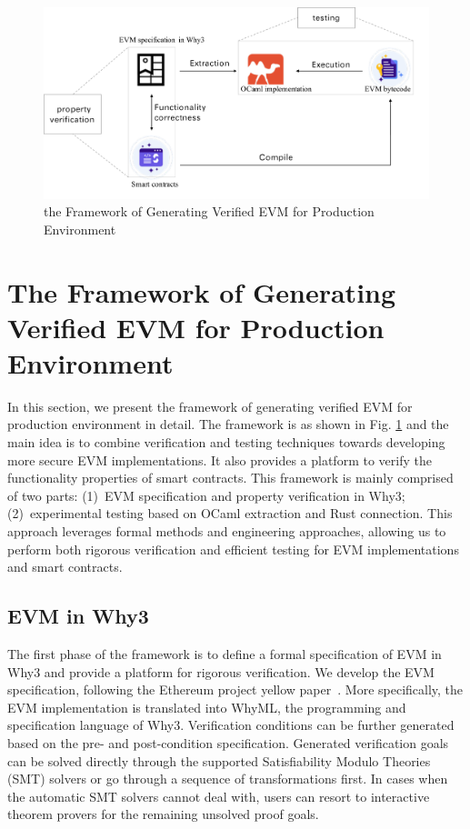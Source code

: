 \documentclass[runningheads]{llncs}
\begin{document}
\begin{figure}[t]
  \centering
  \includegraphics[scale=0.4]{framework.pdf}
  \caption{the Framework of Generating Verified EVM for Production Environment}
  \label{fig:evm1}
\end{figure}

\section{The Framework of Generating Verified EVM for Production Environment}\label{Sec: Framework}
In this section, we present the framework of generating verified EVM for production environment in detail. 
The framework is as shown in Fig. \ref{fig:evm1} and the main idea is to combine verification and testing techniques 
towards developing more secure EVM implementations.
It also provides a platform to verify the functionality properties of smart contracts.  
This framework is mainly comprised of two parts: (1)~EVM specification and property verification in Why3; (2)~experimental testing based on OCaml extraction and Rust connection. 
This approach leverages formal methods and engineering approaches, allowing us to perform 
both rigorous verification and efficient testing for EVM implementations and smart contracts. 

\subsection{EVM in Why3}
The first phase of the framework is to define a formal specification of EVM in Why3 and provide a platform for rigorous verification.  
We develop the EVM specification, following the Ethereum project yellow paper~\cite{wood2014ethereum}. 
More specifically, the EVM implementation is translated into WhyML, 
the programming and specification language of Why3. %
Verification conditions can be further generated
based on the pre- and post-condition specification. 
Generated verification goals can be solved directly through the supported 
Satisfiability Modulo Theories (SMT) solvers or go through a sequence of transformations first. 
In cases when the automatic SMT solvers cannot deal with, users can resort to interactive theorem provers for the remaining unsolved proof goals.
\end{document}

